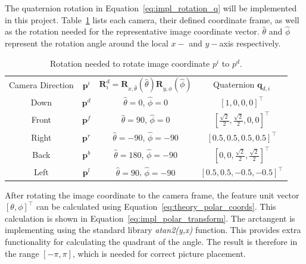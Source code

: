 The quaternion rotation in Equation~\eqref{eq:impl_rotation_q} will be implemented in this project. Table~\ref{tab:impl_quaternion_rotations} lists each camera, their defined coordinate frame, as well as the rotation needed for the representative image coordinate vector. $\hat{\theta}$ and $\hat{\phi}$ represent the rotation angle around the local $x-$ and $y-$axis respectively.

\begin{table}[!htb]
    \centering
    \caption{Rotation needed to rotate image coordinate $p^i$ to $p^d$.}
    \label{tab:impl_quaternion_rotations}
    \begin{tabular}{|c|c|c|c|} \hline
        \multirow{2}{*}{Camera Direction} & \multirow{2}{*}{ $\mathbf{p}^i$} & \multirow{2}{*}{$\mathbf{R}^d_i = \mathbf{R}_{x,\hat{\theta}}(\hat{\theta})\mathbf{R}_{y,\hat{\phi}}(\hat{\phi})$} & \multirow{2}{*}{Quaternion $\mathbf{q}_{d,i}$} \\ &&& \\ \hline \hline
        \multirow{2}{*}{Down} & \multirow{2}{*}{$\mathbf{p}^d$} & \multirow{2}{*}{$\hat{\theta} = 0$, $\hat{\phi} = 0$} & \multirow{2}{*}{$[1,0,0,0]^\top$} \\ &&& \\ \hline
        \multirow{2}{*}{Front} & \multirow{2}{*}{$\mathbf{p}^f$} & \multirow{2}{*}{$\hat{\theta} = 90$, $\hat{\phi} = 0$} & \multirow{2}{*}{$\left[\frac{\sqrt{2}}{2},\frac{\sqrt{2}}{2},0,0\right]^\top$} \\ &&& \\ \hline
        \multirow{2}{*}{Right} & \multirow{2}{*}{$\mathbf{p}^r$} & \multirow{2}{*}{$\hat{\theta} = -90$, $\hat{\phi} = -90$} & \multirow{2}{*}{$[0.5,0.5,0.5,0.5]^\top$} \\ &&& \\ \hline
        \multirow{2}{*}{Back} & \multirow{2}{*}{$\mathbf{p}^b$} & \multirow{2}{*}{$\hat{\theta} = 180$, $\hat{\phi} = -90$} & \multirow{2}{*}{$\left[0,0,\frac{\sqrt{2}}{2},\frac{\sqrt{2}}{2}\right]^\top$} \\ &&& \\ \hline
        \multirow{2}{*}{Left} & \multirow{2}{*}{$\mathbf{p}^l$} & \multirow{2}{*}{$\hat{\theta} = 90$, $\hat{\phi} = -90$} & \multirow{2}{*}{$\left[0.5,0.5,-0.5,-0.5\right]^\top$} \\ &&& \\ \hline
    \end{tabular}
\end{table}

After rotating the image coordinate to the camera frame, the feature unit vector $[\theta, \phi]^\top$ can be calculated using Equation~\eqref{eq:theory_polar_coords}. This calculation is shown in Equation~\eqref{eq:impl_polar_transform}. The arctangent is implementing using the standard library \emph{atan2(y,x)} function. This provides extra functionality for calculating the quadrant of the angle. The result is therefore in the range $[-\pi,\pi]$, which is needed for correct picture placement.

